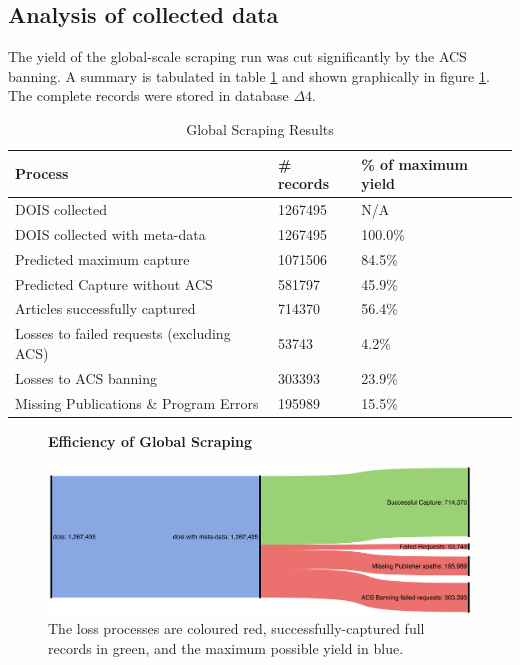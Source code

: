 \subsection{Analysis of collected data}
The yield of the global-scale scraping run was cut significantly by the ACS banning. A summary is tabulated in table \ref{tab:LARGESCRAPERES} and shown graphically in figure \ref{fig:LARGESANK}. The complete records were stored in database $\Delta4$.
\begin{table}[h!]
\caption{Global Scraping Results}
\label{tab:LARGESCRAPERES}
\begin{center}
\begin{tabular}{||l|l|l||}
\hline
Process & \# records & \% of maximum yield\\
\hline
DOIS collected &  1267495 &N/A\\
DOIS collected with meta-data &  1267495 &100.0\%\\

\hline
Predicted maximum capture & 1071506 &  84.5\%\\
Predicted Capture without ACS & 581797 & 45.9\%\\
\hline
Articles successfully captured & 714370 & 56.4\%\\
Losses to failed requests (excluding ACS)& 53743 & 4.2\%\\
Losses to ACS banning & 303393 & 23.9\%\\
Missing Publications \& Program Errors & 195989 & 15.5\%\\
\hline
\end{tabular}
\end{center}
\end{table}
\begin{figure}[H]
    \centering
    \textbf{Efficiency of Global Scraping}\par\medskip
    \includegraphics[width=\textwidth]{Data_Acquisition/large_sankey.png}
    \caption[Efficiency of Large Scale Scraping]{The loss processes are coloured red, successfully-captured full records in green, and the maximum possible yield in blue.}
     \label{fig:LARGESANK}
\end{figure}

